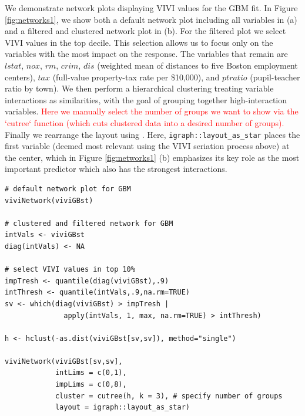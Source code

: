 We demonstrate network plots displaying VIVI values for the GBM fit. In Figure \ref{fig:networks1}, we show both a default network plot including all variables in (a) and a filtered and clustered network plot in (b). For the filtered plot we select VIVI values in the top decile. This selection allows us to focus only on the variables with the most impact on the response. The variables that remain are \(lstat\), \(nox\), \(rm\), \(crim\), \(dis\) (weighted mean of distances to five Boston employment centers), \(tax\) (full-value property-tax rate per \$10,000), and \(ptratio\) (pupil-teacher ratio by town). We then perform a hierarchical clustering treating variable interactions as similarities, with the goal of grouping together high-interaction variables. \textcolor{red}{Here we manually select the number of groups we want to show via the `cutree` function (which cuts clustered data into a desired number of groups).} Finally we rearrange the layout using . Here, \texttt{igraph::layout\_as\_star} places the first variable (deemed most relevant using the VIVI seriation process above) at the center, which in Figure \ref{fig:networks1} (b) emphasizes its key role as the most important predictor which also has the strongest interactions.

\begin{verbatim}
# default network plot for GBM
viviNetwork(viviGBst)

# clustered and filtered network for GBM
intVals <- viviGBst
diag(intVals) <- NA 

# select VIVI values in top 10%
impTresh <- quantile(diag(viviGBst),.9)
intThresh <- quantile(intVals,.9,na.rm=TRUE)
sv <- which(diag(viviGBst) > impTresh |
              apply(intVals, 1, max, na.rm=TRUE) > intThresh)
              
h <- hclust(-as.dist(viviGBst[sv,sv]), method="single")

viviNetwork(viviGBst[sv,sv],
            intLims = c(0,1),
            impLims = c(0,8),
            cluster = cutree(h, k = 3), # specify number of groups
            layout = igraph::layout_as_star)
\end{verbatim}


